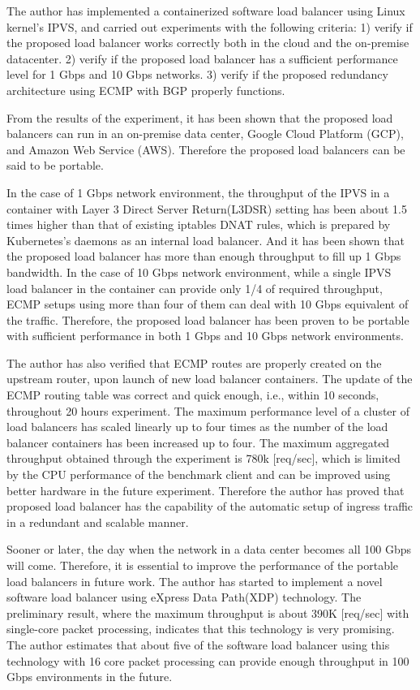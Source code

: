 The author has implemented a containerized software load balancer using Linux kernel's IPVS, and carried out experiments with the following criteria:
  1) verify if the proposed load balancer works correctly both in the cloud and the on-premise datacenter.
  2) verify if the proposed load balancer has a sufficient performance level for 1 Gbps and 10 Gbps networks.
  3) verify if the proposed redundancy architecture using ECMP with BGP properly functions.

From the results of the experiment, it has been shown that the proposed load balancers can run in an on-premise data center, Google Cloud Platform (GCP), and Amazon Web Service (AWS).
Therefore the proposed load balancers can be said to be portable.

  In the case of 1 Gbps network environment, the throughput of the IPVS in a container with Layer 3 Direct Server Return(L3DSR) setting has been about 1.5 times higher than that of existing iptables DNAT rules, which is prepared by Kubernetes's daemons as an internal load balancer. 
  And it has been shown that the proposed load balancer has more than enough throughput to fill up 1 Gbps bandwidth.
  In the case of 10 Gbps network environment, while a single IPVS load balancer in the container can provide only 1/4 of required throughput, ECMP setups using more than four of them can deal with 10 Gbps equivalent of the traffic.
  Therefore, the proposed load balancer has been proven to be portable with sufficient performance in both 1 Gbps and 10 Gbps network environments.

The author has also verified that ECMP routes are properly created on the upstream router, upon launch of new load balancer containers.
%
The update of the ECMP routing table was correct and quick enough, i.e., within 10 seconds, throughout 20 hours experiment.
The maximum performance level of a cluster of load balancers has scaled linearly up to four times as the number of the load balancer containers has been increased up to four.
The maximum aggregated throughput obtained through the experiment is 780k [req/sec], which is limited by the CPU performance of the benchmark client and can be improved using better hardware in the future experiment.
Therefore the author has proved that proposed load balancer has the capability of the automatic setup of ingress traffic in a redundant and scalable manner.

Sooner or later, the day when the network  in a data center becomes all 100 Gbps will come.
  Therefore, it is essential to improve the performance of the portable load balancers in future work.
  The author has started to implement a novel software load balancer using eXpress Data Path(XDP) technology.
  The preliminary result, where the maximum throughput is about 390K [req/sec] with single-core packet processing, indicates that this technology is very promising.
%
The author estimates that about five of the software load balancer using this technology with 16 core packet processing can provide enough throughput in 100  Gbps environments in the future. 

